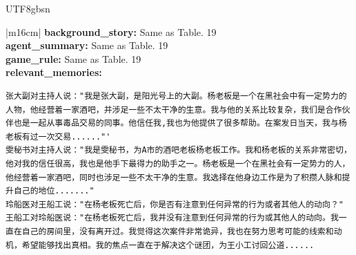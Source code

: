 \documentclass[11pt]{article}
\begin{document}
{\begin{CJK}{UTF8}{gbsn}
\begin{table}[ht!]
\begin{tabular}{|m{16cm}|}
\textbf{   background\_story:} \small Same as Table. 19 \\
 \textbf{   agent\_summary:} \small Same as Table. 19\\
 \textbf{   game\_rule:} \small Same as Table. 19 \\
\textbf{   relevant\_memories:} \\
\begin{minipage}[t]{\linewidth}
\small\begin{verbatim}
张大副对主持人说："我是张大副，是阳光号上的大副。杨老板是一个在黑社会中有一定势力的人物，他经营着一家酒吧，并涉足一些不太干净的生意。我与他的关系比较复杂，我们是合作伙伴也是一起从事毒品交易的同事。他信任我,我也为他提供了很多帮助。在案发日当天，我与杨老板有过一次交易......"'
雯秘书对主持人说："我是雯秘书，为A市的酒吧老板杨老板工作。我和杨老板的关系非常密切，他对我的信任很高，我也是他手下最得力的助手之一。杨老板是一个在黑社会有一定势力的人，他经营着一家酒吧，同时也涉足一些不太干净的生意。我选择在他身边工作是为了积攒人脉和提升自己的地位......."
玲船医对王船工说："在杨老板死亡后，你是否有注意到任何异常的行为或者其他人的动向？"
王船工对玲船医说："在杨老板死亡后，我并没有注意到任何异常的行为或其他人的动向。我一直在自己的房间里，没有离开过。我觉得这次案件非常诡异，我也在努力思考可能的线索和动机，希望能够找出真相。我的焦点一直在于解决这个谜团，为王小工讨回公道......


\end{verbatim}
\end{minipage}
\end{tabular}
\end{table}
\end{CJK}}
\end{document}

